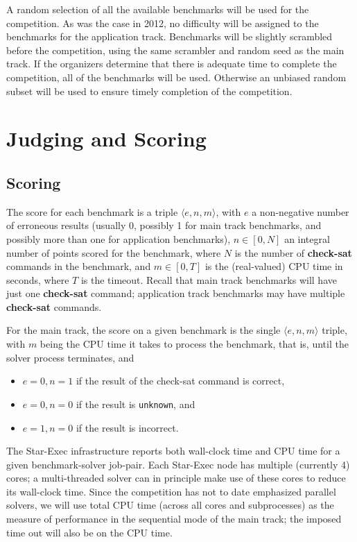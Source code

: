 \documentclass[12pt]{article}
\newcommand{\akey}[1]{\textbf{#1}}
\begin{document}
A random selection of all the available benchmarks will be used for the competition. 
As was the case in 2012, no difficulty will be assigned to the benchmarks for the application track.
Benchmarks will be slightly scrambled before the competition, using the same scrambler and 
random seed as the main track. 
If the organizers determine that there is adequate time to complete the competition, all of the benchmarks will be used. Otherwise an unbiased random subset will be used to ensure timely completion of the competition.

\section{Judging and Scoring}
\label{sec:judging}

\subsection{Scoring}

The score for each benchmark is a triple $\langle e,n,m\rangle$, with
$e$ a non-negative number of erroneous results (usually 0, possibly 1 for main track benchmarks, and possibly more than one for application benchmarks),
$n\in[0,N]$ an integral number of points scored for the benchmark,
where $N$ is the number of \akey{check-sat} commands
in the benchmark, and $m\in[0,T]$ is the (real-valued) CPU time in seconds, where $T$ is
the timeout.  Recall that main track benchmarks will have just one \akey{check-sat} command;
application track benchmarks may have multiple \akey{check-sat} commands.

For the main track, the score on a given benchmark is the single $\langle e,n,m\rangle$ triple, with $m$ being the CPU time it takes to process the benchmark, that is, until the solver process terminates, and
\begin{itemize}
\item $e=0, n=1$ if the result of the check-sat command is correct,
\item $e=0, n=0$ if the result is {\tt unknown}, and
\item $e=1, n=0$ if the result is incorrect.
\end{itemize}

The Star-Exec infrastructure reports both wall-clock time and CPU time for a given benchmark-solver job-pair. Each Star-Exec node has multiple (currently 4) cores; a multi-threaded solver can in principle make use of these cores to reduce its wall-clock time. Since the competition has not to date emphasized parallel solvers, we will use total CPU time (across all cores and subprocesses) as the measure of performance in the sequential mode of the main track; the imposed time out will also be on the CPU time.
\end{document}
